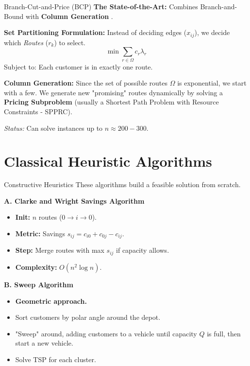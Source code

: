 \documentclass{beamer}
\begin{document}
\begin{frame}{Branch-Cut-and-Price (BCP)}
    \textbf{The State-of-the-Art:}
    Combines Branch-and-Bound with \textbf{Column Generation} \cite{fukasawa2006robust}.
    
    \textbf{Set Partitioning Formulation:}
    Instead of deciding edges ($x_{ij}$), we decide which \textit{Routes} ($r_k$) to select.
    $$ \min \sum_{r \in \Omega} c_r \lambda_r $$
    Subject to: Each customer is in exactly one route.
    
    \textbf{Column Generation:}
    Since the set of possible routes $\Omega$ is exponential, we start with a few. We generate new "promising" routes dynamically by solving a \textbf{Pricing Subproblem} (usually a Shortest Path Problem with Resource Constraints - SPPRC).
    
    \textit{Status:} Can solve instances up to $n \approx 200-300$.
\end{frame}

\section{Classical Heuristic Algorithms}

\begin{frame}{Constructive Heuristics}
    These algorithms build a feasible solution from scratch.
    
    \textbf{A. Clarke and Wright Savings Algorithm} \cite{shour2015modified}
    \begin{itemize}
        \item \textbf{Init:} $n$ routes ($0 \to i \to 0$).
        \item \textbf{Metric:} Savings $s_{ij} = c_{i0} + c_{0j} - c_{ij}$.
        \item \textbf{Step:} Merge routes with max $s_{ij}$ if capacity allows.
        \item \textbf{Complexity:} $O(n^2 \log n)$.
    \end{itemize}
    
    \textbf{B. Sweep Algorithm} \cite{sehta2021sweep}
    \begin{itemize}
        \item \textbf{Geometric approach.}
        \item Sort customers by polar angle around the depot.
        \item "Sweep" around, adding customers to a vehicle until capacity $Q$ is full, then start a new vehicle.
        \item Solve TSP for each cluster.
    \end{itemize}
\end{frame}
\end{document}
